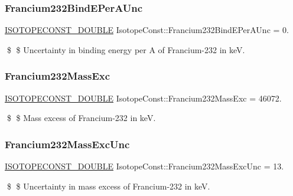 \subsubsection{\texorpdfstring{Francium232\+Bind\+E\+Per\+A\+Unc}{Francium232BindEPerAUnc}}
{\footnotesize\ttfamily \mbox{\hyperlink{group___isotope_const-_macros_ga8f45a7272ce02c0b4c65c44636ed719a}{I\+S\+O\+T\+O\+P\+E\+C\+O\+N\+S\+T\+\_\+\+D\+O\+U\+B\+LE}} Isotope\+Const\+::\+Francium232\+Bind\+E\+Per\+A\+Unc = 0.}

\$ \$ Uncertainty in binding energy per A of Francium-\/232 in keV. \mbox{\label{group___isotope_const-_francium-_fr232_ga86f51945091aab85468de57c52bbda2c}} 
\subsubsection{\texorpdfstring{Francium232\+Mass\+Exc}{Francium232MassExc}}
{\footnotesize\ttfamily \mbox{\hyperlink{group___isotope_const-_macros_ga8f45a7272ce02c0b4c65c44636ed719a}{I\+S\+O\+T\+O\+P\+E\+C\+O\+N\+S\+T\+\_\+\+D\+O\+U\+B\+LE}} Isotope\+Const\+::\+Francium232\+Mass\+Exc = 46072.}

\$ \$ Mass excess of Francium-\/232 in keV. \mbox{\label{group___isotope_const-_francium-_fr232_ga839f2770bee791935e0b9d9c3b4359cd}} 
\subsubsection{\texorpdfstring{Francium232\+Mass\+Exc\+Unc}{Francium232MassExcUnc}}
{\footnotesize\ttfamily \mbox{\hyperlink{group___isotope_const-_macros_ga8f45a7272ce02c0b4c65c44636ed719a}{I\+S\+O\+T\+O\+P\+E\+C\+O\+N\+S\+T\+\_\+\+D\+O\+U\+B\+LE}} Isotope\+Const\+::\+Francium232\+Mass\+Exc\+Unc = 13.}

\$ \$ Uncertainty in mass excess of Francium-\/232 in keV. \mbox{\label{group___isotope_const-_francium-_fr232_ga24ae9bba60b9c221a466b3a3bfd146f1}} 
